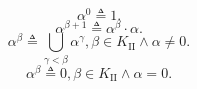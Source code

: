 $$\alpha^0 \triangleq 1.$$
$$\alpha^{\beta+1} \triangleq \alpha^\beta \cdot \alpha.$$
$$\alpha^\beta \triangleq \bigcup_{\gamma < \beta} \alpha^\gamma, \beta \in K_{\text{II}} \wedge \alpha \neq 0.$$
$$\alpha^\beta \triangleq 0, \beta \in K_{\text{II}} \wedge \alpha = 0.$$
